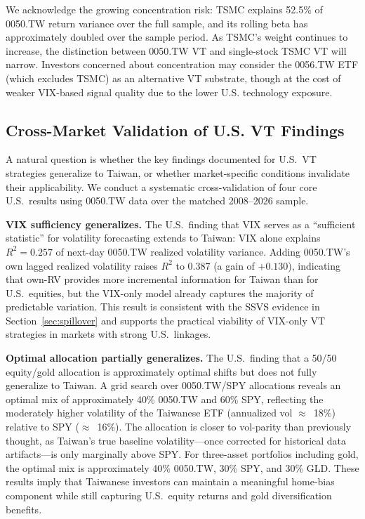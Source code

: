 We acknowledge the growing concentration risk: TSMC explains 52.5\% of 0050.TW return variance over the full sample, and its rolling beta has approximately doubled over the sample period. As TSMC's weight continues to increase, the distinction between 0050.TW VT and single-stock TSMC VT will narrow. Investors concerned about concentration may consider the 0056.TW ETF (which excludes TSMC) as an alternative VT substrate, though at the cost of weaker VIX-based signal quality due to the lower U.S. technology exposure.

\subsection{Cross-Market Validation of U.S. VT Findings}
\label{sec:cross_validation}

A natural question is whether the key findings documented for U.S.\ VT strategies generalize to Taiwan, or whether market-specific conditions invalidate their applicability. We conduct a systematic cross-validation of four core U.S.\ results using 0050.TW data over the matched 2008--2026 sample.

\textbf{VIX sufficiency generalizes.} The U.S.\ finding that VIX serves as a ``sufficient statistic'' for volatility forecasting extends to Taiwan: VIX alone explains $R^2 = 0.257$ of next-day 0050.TW realized volatility variance. Adding 0050.TW's own lagged realized volatility raises $R^2$ to 0.387 (a gain of $+0.130$), indicating that own-RV provides more incremental information for Taiwan than for U.S.\ equities, but the VIX-only model already captures the majority of predictable variation. This result is consistent with the SSVS evidence in Section~\ref{sec:spillover} and supports the practical viability of VIX-only VT strategies in markets with strong U.S.\ linkages.

\textbf{Optimal allocation partially generalizes.} The U.S.\ finding that a 50/50 equity/gold allocation is approximately optimal shifts but does not fully generalize to Taiwan. A grid search over 0050.TW/SPY allocations reveals an optimal mix of approximately 40\% 0050.TW and 60\% SPY, reflecting the moderately higher volatility of the Taiwanese ETF (annualized vol $\approx$~18\%) relative to SPY ($\approx$~16\%). The allocation is closer to vol-parity than previously thought, as Taiwan's true baseline volatility---once corrected for historical data artifacts---is only marginally above SPY. For three-asset portfolios including gold, the optimal mix is approximately 40\% 0050.TW, 30\% SPY, and 30\% GLD. These results imply that Taiwanese investors can maintain a meaningful home-bias component while still capturing U.S.\ equity returns and gold diversification benefits.

